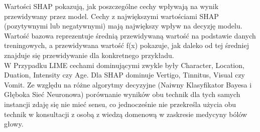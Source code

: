 Wartości SHAP pokazują, jak poszczególne cechy wpływają na wynik przewidywany przez model.
Cechy z największymi wartościami SHAP (pozytywnymi lub negatywnymi) mają największy wpływ na decyzję modelu.
Wartość bazowa reprezentuje średnią przewidywaną wartość na podstawie danych treningowych, a przewidywana wartość f(x) pokazuje, jak daleko od tej średniej znajduje się przewidywanie dla konkretnego przykładu.\\

W Przypadku LIME cechami dominującymi zwykle były Character, Location, Duation, Intensity czy Age. Dla SHAP dominuje Vertigo, Tinnitus, Visual czy Vomit. Ze względu na różne algorytmy decyzyjne (Naiwny Klasyfikator Bayesa i Głęboka Sieć Neuronowa) porównanie wyników obu technik dla tych samych instancji zdaję się nie mieć sensu, co jednocześnie nie przekreśla użycia obu technik w konsultacji z osobą z wiedzą domenową w zaskresie medycyny bólów głowy.